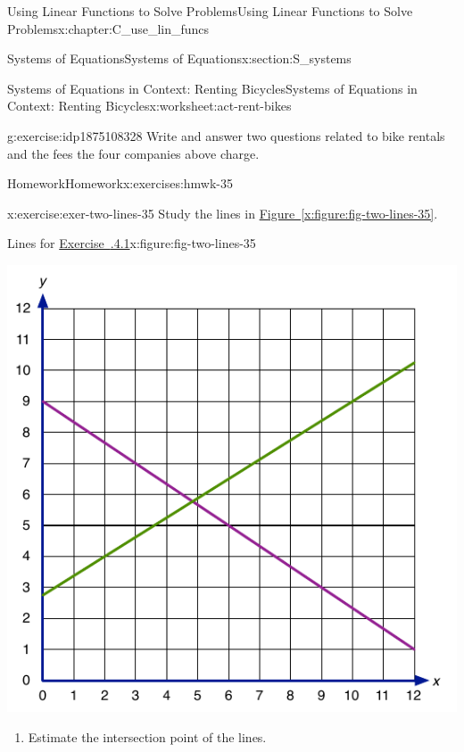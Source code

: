 \documentclass[oneside,10pt,]{book}
\newcommand{\xreffont}{\relax}
\numberwithin{equation}{chapter}
\begin{document}
\begin{chapterptx}{Using Linear Functions to Solve Problems}{}{Using Linear Functions to Solve Problems}{}{}{x:chapter:C_use_lin_funcs}
\begin{sectionptx}{Systems of Equations}{}{Systems of Equations}{}{}{x:section:S_systems}
\begin{worksheet-subsection}{Systems of Equations in Context: Renting Bicycles}{}{Systems of Equations in Context: Renting Bicycles}{}{}{x:worksheet:act-rent-bikes}
\begin{divisionexercise}{6}{}{}{g:exercise:idp1875108328}
Write and answer two questions related to bike rentals and the fees the four companies above charge.%
\end{divisionexercise}%
\end{worksheet-subsection}
\restoregeometry
%
%
\typeout{************************************************}
\typeout{************************************************}
%
\begin{exercises-subsection}{Homework}{}{Homework}{}{}{x:exercises:hmwk-35}
\begin{divisionexercise}{1}{}{}{x:exercise:exer-two-lines-35}%
Study the lines in \hyperref[x:figure:fig-two-lines-35]{Figure~{\xreffont\ref{x:figure:fig-two-lines-35}}}.%
\begin{figureptx}{Lines for \hyperlink{x:exercise:exer-two-lines-35}{Exercise~{\xreffont 3.5.4.1}}}{x:figure:fig-two-lines-35}{}%
\begin{image}{0.25}{0.5}{0.25}%
\includegraphics[width=\linewidth]{external/two-lines-35.pdf}
\end{image}%
\tcblower
\end{figureptx}%
\begin{enumerate}[font=\bfseries,label=(\alph*),ref=\alph*]
\item\label{x:task:exer-two-lines-intersect}Estimate the intersection point of the lines.%

\end{enumerate}
\end{divisionexercise}
\end{exercises-subsection}
\end{sectionptx}
\end{chapterptx}
\end{document}
